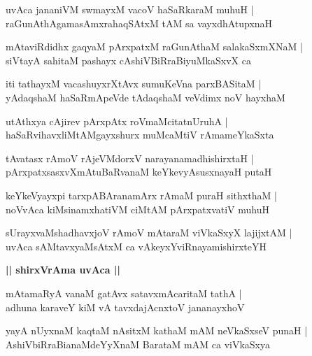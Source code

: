 \documentclass[twoside,12pt,openright]{book}
\newcounter{shloka}[chapter]
\def\uvaca#1{\centerline{{\large\textbf{#1}}}}
\begin{document}
\begin{shloka}%
uvAca jananiVM swmayxM vacoV haSaRkaraM muhuH |\\
raGunAthAgamasAmxrahaqSAtxM tAM sa vayxdhAtupxnaH 
\end{shloka}

\begin{shloka}%
mAtaviRdidhx gaqyaM pArxpatxM raGunAthaM salakaSxmXNaM |\\
siVtayA sahitaM pashayx cAshiVBiRraBiyuMkaSxvX ca
\end{shloka}

\begin{shloka}%
iti tathayxM  vacashuyxrXtAvx sumuKeVna parxBASitaM |\\
yAdaqshaM haSaRmApeVde tAdaqshaM veVdimx noV hayxhaM 
\end{shloka}

\begin{shloka}%
utAthxya cAjirev pArxpAtx roVmaMcitatnUruhA |\\
haSaRvihavxliMtAMgayxshurx muMcaMtiV rAmameYkaSxta
\end{shloka}

\begin{shloka}%
tAvatasx rAmoV rAjeVMdorxV narayanamadhishirxtaH |\\
pArxpatxsasxvXmAtuBaRvanaM keYkevyAsusxnayaH putaH 
\end{shloka}

\begin{shloka}%
keYkeVyayxpi tarxpABAranamArx rAmaM puraH sithxthaM |\\
noVvAca kiMsinamxhatiVM ciMtAM pArxpatxvatiV muhuH
\end{shloka}

\begin{shloka}%
sUrayxvaMshadhavxjoV rAmoV mAtaraM viVkaSxyX lajijxtAM |\\
uvAca sAMtavxyaMsAtxM ca vAkeyxYviRnayamishirxteYH
\end{shloka}

\uvaca{|| shirxVrAma uvAca ||}

\begin{shloka}%
mAtamaRyA vanaM gatAvx satavxmAcaritaM tathA |\\
adhuna karaveY kiM vA tavxdajAcnxtoV jananayxhoV 
\end{shloka}

\begin{shloka}%
yayA nUyxnaM kaqtaM nAsitxM kathaM mAM neVkaSxseV punaH |\\
AshiVbiRraBianaMdeYyXnaM BarataM mAM ca viVkaSxya 
\end{shloka}
\end{document}
